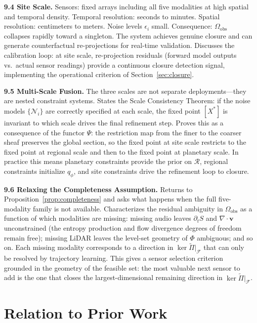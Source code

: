 \documentclass[12pt, oneside]{article}
\newcommand{\Ftil}{\widetilde{\Pi}}
\begin{document}
{\medskip
\textbf{9.4 Site Scale.}
Sensors: fixed arrays including all five modalities at high spatial and temporal density.
Temporal resolution: seconds to minutes. Spatial resolution: centimeters to meters. Noise
levels $\epsilon_i$ small. Consequence: $\Omega_{\mathrm{obs}}$ collapses rapidly toward
a singleton. The system achieves genuine closure and can generate counterfactual
re-projections for real-time validation. Discusses the calibration loop: at site scale,
re-projection residuals (forward model outputs vs.\ actual sensor readings) provide a
continuous closure detection signal, implementing the operational criterion of
Section~\ref{sec:closure}.

\medskip
\textbf{9.5 Multi-Scale Fusion.}
The three scales are not separate deployments---they are nested constraint systems. States
the Scale Consistency Theorem: if the noise models $\{\mathcal{N}_i\}$ are correctly
specified at each scale, the fixed point $[X^*]$ is invariant to which scale drives the
final refinement step. Proves this as a consequence of the functor $\Psi$: the
restriction map from the finer to the coarser sheaf preserves the global section, so the
fixed point at site scale restricts to the fixed point at regional scale and then to the
fixed point at planetary scale. In practice this means planetary constraints provide the
prior on $\mathcal{R}$, regional constraints initialize $q_\phi$, and site constraints
drive the refinement loop to closure.

\medskip
\textbf{9.6 Relaxing the Completeness Assumption.}
Returns to Proposition~\ref{prop:completeness} and asks what happens when the full
five-modality family is not available. Characterizes the residual ambiguity in
$\Omega_{\mathrm{obs}}$ as a function of which modalities are missing: missing audio
leaves $\partial_t S$ and $\nabla \cdot \mathbf{v}$ unconstrained (the entropy production
and flow divergence degrees of freedom remain free); missing LiDAR leaves the level-set
geometry of $\Phi$ ambiguous; and so on. Each missing modality corresponds to a direction
in $\ker \Ftil|_{\mathcal{F}}$ that can only be resolved by trajectory learning. This
gives a sensor selection criterion grounded in the geometry of the feasible set: the most
valuable next sensor to add is the one that closes the largest-dimensional remaining
direction in $\ker \Ftil|_{\mathcal{F}}$.
}

\section{Relation to Prior Work}
\label{sec:related}
\end{document}
